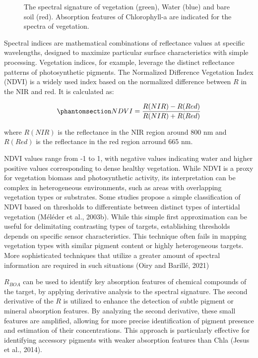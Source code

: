 \documentclass[
  letterpaper,
  11pt,
  english,
  singlespacing,
  headsepline]{MastersDoctoralThesis}
\begin{document}
\begin{spacing}{1.5}
\begin{figure}
{}

\caption{\label{fig-Spectral_signature}The spectral signature of
vegetation (green), Water (blue) and bare soil (red). Absorption
features of Chlorophyll-a are indicated for the spectra of vegetation.}

\end{figure}%

Spectral indices are mathematical combinations of reflectance values at
specific wavelengths, designed to maximize particular surface
characteristics with simple processing. Vegetation indices, for example,
leverage the distinct reflectance patterns of photosynthetic pigments.
The Normalized Difference Vegetation Index (NDVI) is a widely used index
based on the normalized difference between \(R\) in the NIR and red. It
is calculated as:

\begin{equation}\phantomsection\label{eq-NDVI}{
NDVI = \frac{R(NIR)-R(Red)}{R(NIR)+R(Red)}
}\end{equation}

where \(R(NIR)\) is the reflectance in the NIR region around 800 nm and
\(R(Red)\) is the reflectance in the red region arround 665 nm.

NDVI values range from -1 to 1, with negative values indicating water
and higher positive values corresponding to dense healthy vegetation.
While NDVI is a proxy for vegetation biomass and photosynthetic
activity, its interpretation can be complex in heterogeneous
environments, such as areas with overlapping vegetation types or
substrates. Some studies propose a simple classification of NDVI based
on thresholds to differentiate between distinct types of intertidal
vegetation (Méléder et al., 2003b). While this simple first
approximation can be useful for delimitating contrasting types of
targets, establishing thresholds depends on specific sensor
characteristics. This technique often fails in mapping vegetation types
with similar pigment content or highly heterogeneous targets. More
sophisticated techniques that utilize a greater amount of spectral
information are required in such situations (Oiry and Barillé, 2021)

\(R_{BOA}\) can be used to identify key absorption features of chemical
compounds of the target, by applying derivative analysis to the spectral
signature. The second derivative of the \(R\) is utilized to enhance the
detection of subtle pigment or mineral absorption features. By analyzing
the second derivative, these small features are amplified, allowing for
more precise identification of pigment presence and estimation of their
concentrations. This approach is particularly effective for identifying
accessory pigments with weaker absorption features than Chla (Jesus et
al., 2014).


\end{spacing}
\end{document}
